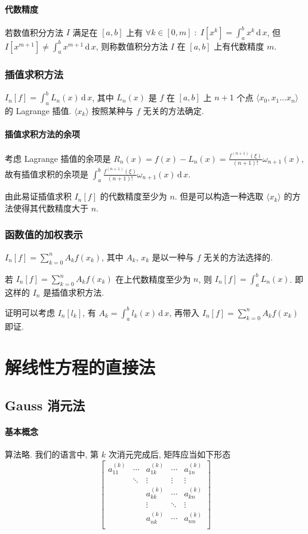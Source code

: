 \documentclass{ctexart}
\newcommand{\ud}{\,\mathrm{d}\,}
\begin{document}
\paragraph{代数精度}
    若数值积分方法 $I$ 满足在 $[a,b]$ 上有
    $\forall k \in [0, m]\;:\; I[x^k] = \int_a^b x^k \ud x$,
    但 $I[x^{m+1}] \neq \int_a^b x^{m+1} \ud x$,
    则称数值积分方法 $I$ 在 $[a,b]$ 上有代数精度 $m$.
\subsubsection{插值求积方法}
    $I_n[f] = \int_a^b L_n(x) \ud x$,
    其中 $L_n(x)$ 是 $f$ 在 $[a,b]$ 上 $n+1$ 个点
    $\langle x_0, x_1 \ldots x_n \rangle$ 的 Lagrange 插值.
    $\langle x_k \rangle$ 按照某种与 $f$ 无关的方法确定.
\paragraph{插值求积方法的余项}
    考虑 Lagrange 插值的余项是
    $R_n(x) = f(x) - L_n(x) =
        \frac{f^{(n+1)}(\xi)}{(n+1)!} \omega_{n+1}(x)$,
    故有插值求积的余项是
    $\int_a^b \frac{f^{(n+1)}(\xi)}{(n+1)!} \omega_{n+1}(x) \ud x$.\par
    由此易证插值求积 $I_n[f]$ 的代数精度至少为 $n$.
    但是可以构造一种选取 $\langle x_k \rangle$
    的方法使得其代数精度大于 $n$.
\subsubsection{函数值的加权表示}
    $I_n[f] = \sum_{k = 0}^n A_k f(x_k)$,
    其中 $A_k$, $x_k$ 是以一种与 $f$ 无关的方法选择的.\par
    若 $I_n[f] = \sum_{k=0}^n A_k f(x_k)$ 在上代数精度至少为 $n$,
    则 $I_n[f] = \int_a^b L_n(x)$. 即这样的 $I_n$ 是插值求积方法.\par
    证明可以考虑 $I_n[l_k]$, 有 $A_k = \int_a^b l_k(x) \ud x$,
    再带入 $I_n[f] = \sum_{k=0}^n A_k f(x_k)$ 即证.


\section{解线性方程的直接法}
\subsection{Gauss 消元法}
\paragraph{基本概念}
    算法略. 我们的语言中, 第 $k$ 次消元完成后, 矩阵应当如下形态 \[
        \begin{bmatrix}
            a^{(k)}_{11} & \cdots & a^{(k)}_{1k}  & \cdots & a^{(k)}_{1n} \\
                         & \ddots & \vdots        & \vdots & \vdots              \\
                         &        & a^{(k)}_{k k} & \cdots & a^{(k)}_{kn}        \\
                         &        & \vdots        & \ddots & \vdots              \\
                         &        & a^{(k)}_{n k} & \cdots & a^{(k)}_{nn}        \\
        \end{bmatrix}\]
\end{document}
